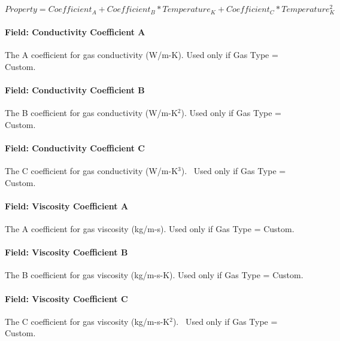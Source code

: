 \begin{equation}
Property = Coefficien{t_A} + Coefficien{t_B}*Temperatur{e_K} + Coefficien{t_C}*Temperature_K^2
\end{equation}

\paragraph{Field: Conductivity Coefficient A}\label{field-conductivity-coefficient-a}

The A coefficient for gas conductivity (W/m-K). Used only if Gas Type = Custom.

\paragraph{Field: Conductivity Coefficient B}\label{field-conductivity-coefficient-b}

The B coefficient for gas conductivity (W/m-K\(^{2}\)). Used only if Gas Type = Custom.

\paragraph{Field: Conductivity Coefficient C}\label{field-conductivity-coefficient-c}

The C coefficient for gas conductivity (W/m-K\(^{3}\)).~ Used only if Gas Type = Custom.

\paragraph{Field: Viscosity Coefficient A}\label{field-viscosity-coefficient-a}

The A coefficient for gas viscosity (kg/m-s). Used only if Gas Type = Custom.

\paragraph{Field: Viscosity Coefficient B}\label{field-viscosity-coefficient-b}

The B coefficient for gas viscosity (kg/m-s-K). Used only if Gas Type = Custom.

\paragraph{Field: Viscosity Coefficient C}\label{field-viscosity-coefficient-c}

The C coefficient for gas viscosity (kg/m-s-K\(^{2}\)).~ Used only if Gas Type = Custom.

